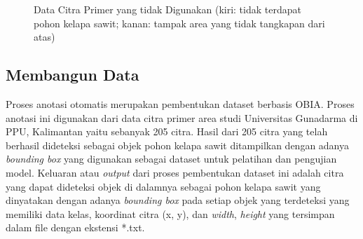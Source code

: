 \begin{figure}[H]
	\vspace{-0.1cm}
	\centering
	\qquad
	\vspace{-0.2cm}
	\captionsetup{justification=centering}
	\caption{Data Citra Primer yang tidak Digunakan (kiri: tidak terdapat pohon kelapa sawit; kanan: tampak area yang tidak tangkapan dari atas) }\label{img:Data-Citra-Primer-Yang-Tidak-Digunakan}
\end{figure}

\subsection{Membangun Data}
\label{sec:membangun-data}
\hspace{1,2cm}
Proses anotasi otomatis merupakan pembentukan dataset berbasis OBIA. Proses anotasi ini digunakan dari data citra primer area studi Universitas Gunadarma di PPU, Kalimantan yaitu sebanyak 205 citra. Hasil dari 205 citra yang telah berhasil dideteksi sebagai objek pohon kelapa sawit ditampilkan dengan adanya \textit{bounding box} yang digunakan sebagai dataset untuk pelatihan dan pengujian model. Keluaran atau \textit{output} dari proses pembentukan dataset ini adalah citra yang dapat dideteksi objek di dalamnya sebagai pohon kelapa sawit yang dinyatakan dengan adanya \textit{bounding box} pada setiap objek yang terdeteksi yang memiliki data kelas, koordinat citra (x, y), dan \textit{width}, \textit{height} yang tersimpan dalam file dengan ekstensi *.txt.

